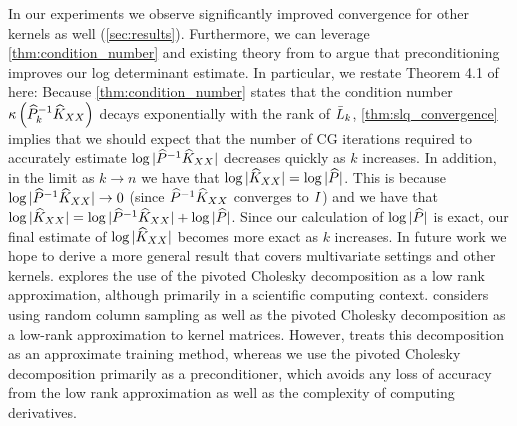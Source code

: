 In our experiments we observe significantly improved convergence for other kernels as well (\cref{sec:results}).
Furthermore, we can leverage \cref{thm:condition_number} and existing theory from \cite{ubaru2017fast} to argue that preconditioning improves our log determinant estimate.
In particular, we restate Theorem 4.1 of \citet{ubaru2017fast} here:
%
Because \cref{thm:condition_number} states that the condition number $\kappa \left( \widehat{P}_{k}^{-1}\widehat{K}_{XX} \right)$ decays exponentially with the rank of $\bar{L}_{k}$, \cref{thm:slq_convergence} implies that we should expect that the number of CG iterations required to accurately estimate $\log \vert \widehat{P}^{-1}\widehat{K}_{XX} \vert$ decreases quickly as $k$ increases.
In addition, in the limit as $k \rightarrow n$ we have that $\log \vert \widehat{K}_{XX} \vert = \log \vert \widehat{P} \vert$.
This is because $\log \vert \widehat{P}^{-1}\widehat{K}_{XX} \vert \rightarrow 0$ (since $\widehat{P}^{-1}\widehat{K}_{XX}$ converges to $I$) and we have that $\log \vert \widehat{K}_{XX} \vert = \log \vert \widehat{P}^{-1}\widehat{K}_{XX} \vert + \log \vert \widehat{P} \vert$.
Since our calculation of $\log \vert \widehat{P} \vert$ is exact, our final estimate of $\log \vert \widehat{K}_{XX} \vert$ becomes more exact as $k$ increases.
In future work we hope to derive a more general result that covers multivariate settings and other kernels.
%
\citet{harbrecht2012low} explores the use of the pivoted Cholesky decomposition as a low rank approximation, although primarily in a scientific computing context.
\citet{bach2013sharp} considers using random column sampling as well as the pivoted Cholesky decomposition as a low-rank approximation to kernel matrices.
However, \citet{bach2013sharp} treats this decomposition as an approximate training method, whereas we use the pivoted Cholesky decomposition primarily
as a preconditioner, which avoids any loss of accuracy from the low rank approximation as well as the complexity of computing derivatives.


